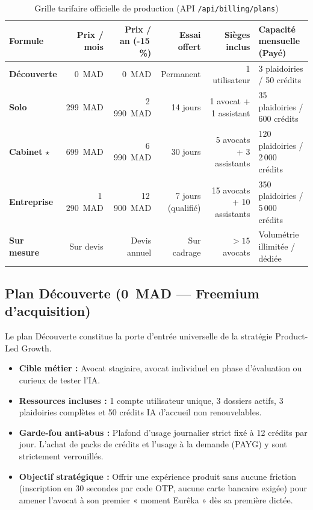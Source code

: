 \begin{table}[H]
\centering
\caption{Grille tarifaire officielle de production (API \texttt{/api/billing/plans})}
\label{tab:plans}
\small
\begin{tabular}{@{}lrrrrl@{}}
\toprule
\textbf{Formule} & \textbf{Prix / mois} & \textbf{Prix / an (-15\,\%)} & \textbf{Essai offert} & \textbf{Sièges inclus} & \textbf{Capacité mensuelle (Payé)} \\
\midrule
\textbf{Découverte} & 0~MAD & 0~MAD & Permanent & 1 utilisateur & 3 plaidoiries / 50 crédits \\
\textbf{Solo} & 299~MAD & 2\,990~MAD & 14 jours & 1 avocat + 1 assistant & 35 plaidoiries / 600 crédits \\
\textbf{Cabinet} $\star$ & 699~MAD & 6\,990~MAD & 30 jours & 5 avocats + 3 assistants & 120 plaidoiries / 2\,000 crédits \\
\textbf{Entreprise} & 1\,290~MAD & 12\,900~MAD & 7 jours (qualifié) & 15 avocats + 10 assistants & 350 plaidoiries / 5\,000 crédits \\
\textbf{Sur mesure} & Sur devis & Devis annuel & Sur cadrage & $> 15$ avocats & Volumétrie illimitée / dédiée \\
\bottomrule
\end{tabular}
\end{table}

\subsection{Plan Découverte (0~MAD --- Freemium d'acquisition)}
Le plan Découverte constitue la porte d'entrée universelle de la stratégie Product-Led Growth. 
\begin{itemize}[leftmargin=*]
  \item \textbf{Cible métier :} Avocat stagiaire, avocat individuel en phase d'évaluation ou curieux de tester l'IA.
  \item \textbf{Ressources incluses :} 1 compte utilisateur unique, 3 dossiers actifs, 3 plaidoiries complètes et 50 crédits IA d'accueil non renouvelables.
  \item \textbf{Garde-fou anti-abus :} Plafond d'usage journalier strict fixé à 12 crédits par jour. L'achat de packs de crédits et l'usage à la demande (PAYG) y sont strictement verrouillés.
  \item \textbf{Objectif stratégique :} Offrir une expérience produit sans aucune friction (inscription en 30 secondes par code OTP, aucune carte bancaire exigée) pour amener l'avocat à son premier « moment Eurêka » dès sa première dictée.
\end{itemize}


